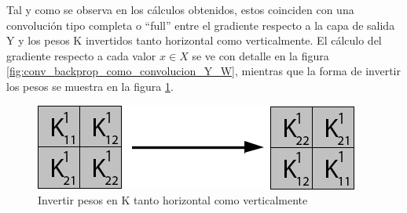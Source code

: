 Tal y como se observa en los cálculos obtenidos, estos coinciden con una convolución tipo completa o ``full'' entre el gradiente respecto a la capa de salida Y y los pesos K invertidos tanto horizontal como verticalmente. El cálculo del gradiente respecto a cada valor $x \in X$ se ve con detalle en la figura \ref{fig:conv_backprop_como_convolucion_Y_W}, mientras que la forma de invertir los pesos se muestra en la figura \ref{fig:flip_W}.  \cite{conv_backprop}

\begin{figure}[H]
	\centering
	\includegraphics[width=0.8\linewidth]{imagenes/flip_pesos.jpg}  
	\caption{Invertir pesos en K tanto horizontal como verticalmente}
	\label{fig:flip_W}
\end{figure}

